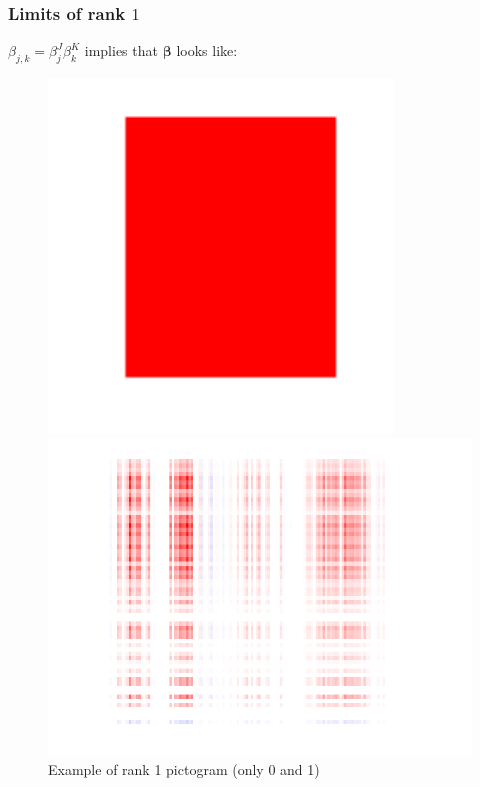 \documentclass{beamer}
\begin{document}
\begin{frame}
    \frametitle{Limits of rank $1$}
    \vspace{10 pt}
    \hspace{60pt} $\beta_{j,k} = \beta_j^J\beta_{k}^{K}$ implies that $\bm{\beta}$ looks like:
    \begin{figure}
        \centering
        \begin{minipage}{0.3\textwidth}
            \centering
            \includegraphics[width=\textwidth]{images/square.png}
            \caption{\centering Example of rank 1 pictogram (only 0 and 1)}
        \end{minipage}
        \hspace{0.1\textwidth}
        \begin{minipage}{0.4\textwidth}
            \centering
            \includegraphics[width=\textwidth]{images/picto_500/heatmap_logistic_multibloc_simu_500_multiway.png}

\end{minipage}
\end{figure}
\end{frame}
\end{document}
